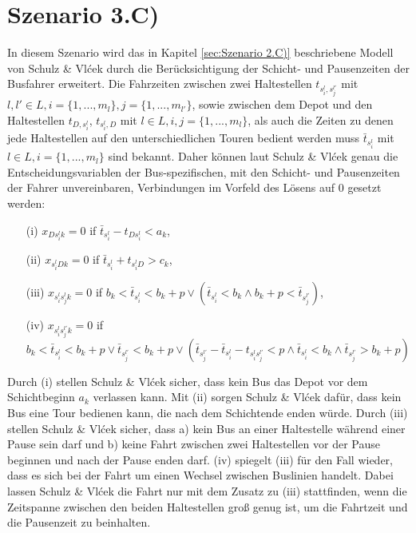 \section{Szenario 3.C)}
\label{sec:4.5}
\label{sec:Szenario 3.C)}
In diesem Szenario wird das in Kapitel \ref{sec:Szenario 2.C)} beschriebene Modell von Schulz \& Vlćek durch die Berücksichtigung der Schicht- und Pausenzeiten der Busfahrer erweitert. Die Fahrzeiten zwischen zwei Haltestellen $t_{s_i^l,s_j^{l'}}$ mit $l,l' \in L, i = \{1,...,m_l\}, j =\{1,...,m_{l'}\}$, sowie zwischen dem Depot und den Haltestellen $t_{D,s_i^l}$, $t_{s_i^l,D}$ mit $l \in L, i,j = \{1,...,m_l\}$, als auch die Zeiten zu denen jede Haltestellen auf den unterschiedlichen Touren bedient werden muss $\bar{t}_{s_i^l}$ mit $l \in L, i = \{1,...,m_l\}$ sind bekannt. Daher können laut Schulz \& Vlćek genau die Entscheidungsvariablen der Bus-spezifischen, mit den Schicht- und Pausenzeiten der Fahrer unvereinbaren, Verbindungen im Vorfeld des Lösens auf 0 gesetzt werden:
\begin{itemize}
    \item[(i)] $x_{D s_i^l k} = 0$ \quad if \quad $\bar{t}_{s_i^l} - t_{D s_i^l} < a_k$,
    
    \item[(ii)] $x_{s_i^l D k} = 0$ \quad if \quad $\bar{t}_{s_i^l} + t_{s_i^l D} > c_k$,
    
    \item[(iii)] $x_{s_i^l s_j^l k} = 0$ \quad if \quad $b_k < \bar{t}_{s_i^l} < b_k + p \lor (\bar{t}_{s_i^l} < b_k \land b_k + p < \bar{t}_{s_j^{l'}})$,
    
    \item[(iv)] $x_{s_i^l s_j^{l'} k} = 0$ \quad if \quad $b_k < \bar{t}_{s_i^l} < b_k + p 
        \lor \bar{t}_{s_j^{l'}} < b_k + p 
        \lor (\bar{t}_{s_j^{l'}} - \bar{t}_{s_i^l} - t_{s_i^l s_j^{l'}} < p 
        \land \bar{t}_{s_i^l} < b_k 
        \land \bar{t}_{s_j^{l'}} > b_k + p)$
\end{itemize}

Durch (i) stellen Schulz \& Vlćek sicher, dass kein Bus das Depot vor dem Schichtbeginn $a_k$ verlassen kann. Mit (ii) sorgen Schulz \& Vlćek dafür, dass kein Bus eine Tour bedienen kann, die nach dem Schichtende enden würde. Durch (iii) stellen Schulz \& Vlćek sicher, dass a) kein Bus an einer Haltestelle während einer Pause sein darf und b) keine Fahrt zwischen zwei Haltestellen vor der Pause beginnen und nach der Pause enden darf. (iv) spiegelt (iii) für den Fall wieder, dass es sich bei der Fahrt um einen Wechsel zwischen Buslinien handelt. Dabei lassen Schulz \& Vlćek die Fahrt nur mit dem Zusatz zu (iii) stattfinden, wenn die Zeitspanne zwischen den beiden Haltestellen groß genug ist, um die Fahrtzeit und die Pausenzeit zu beinhalten.


